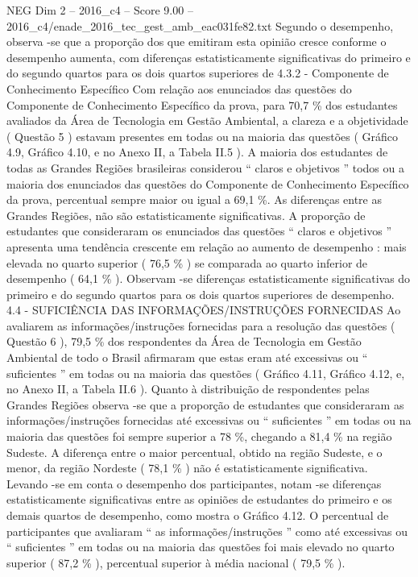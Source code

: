 \begin{textsample}{NEG Dim 2 – 2016\_c4 – Score 9.00 – 2016\_c4/enade\_2016\_tec\_gest\_amb\_eac031fe82.txt}
Segundo o desempenho, observa -se que a proporção dos que emitiram esta opinião cresce conforme o desempenho aumenta, com diferenças estatisticamente significativas do primeiro e do segundo quartos para os dois quartos superiores de 4.3.2 - Componente de Conhecimento Específico Com relação aos enunciados das questões do Componente de Conhecimento Específico da prova, para 70,7 \% dos estudantes avaliados da Área de Tecnologia em Gestão Ambiental, a clareza e a objetividade ( Questão 5 ) estavam presentes em todas ou na maioria das questões ( Gráfico 4.9, Gráfico 4.10, e no Anexo II, a Tabela II.5 ).
A maioria dos estudantes de todas as Grandes Regiões brasileiras considerou “ claros e objetivos ” todos ou a maioria dos enunciados das questões do Componente de Conhecimento Específico da prova, percentual sempre maior ou igual a 69,1 \%.
As diferenças entre as Grandes Regiões, não são estatisticamente significativas.
A proporção de estudantes que consideraram os enunciados das questões “ claros e objetivos ” apresenta uma tendência crescente em relação ao aumento de desempenho : mais elevada no quarto superior ( 76,5 \% ) se comparada ao quarto inferior de desempenho ( 64,1 \% ).
Observam -se diferenças estatisticamente significativas do primeiro e do segundo quartos para os dois quartos superiores de desempenho. 4.4 - SUFICIÊNCIA DAS INFORMAÇÕES/INSTRUÇÕES FORNECIDAS Ao avaliarem as informações/instruções fornecidas para a resolução das questões ( Questão 6 ), 79,5 \% dos respondentes da Área de Tecnologia em Gestão Ambiental de todo o Brasil afirmaram que estas eram até excessivas ou “ suficientes ” em todas ou na maioria das questões ( Gráfico 4.11, Gráfico 4.12, e, no Anexo II, a Tabela II.6 ).
Quanto à distribuição de respondentes pelas Grandes Regiões observa -se que a proporção de estudantes que consideraram as informações/instruções fornecidas até excessivas ou “ suficientes ” em todas ou na maioria das questões foi sempre superior a 78 \%, chegando a 81,4 \% na região Sudeste.
A diferença entre o maior percentual, obtido na região Sudeste, e o menor, da região Nordeste ( 78,1 \% ) não é estatisticamente significativa.
Levando -se em conta o desempenho dos participantes, notam -se diferenças estatisticamente significativas entre as opiniões de estudantes do primeiro e os demais quartos de desempenho, como mostra o Gráfico 4.12.
O percentual de participantes que avaliaram “ as informações/instruções ” como até excessivas ou “ suficientes ” em todas ou na maioria das questões foi mais elevado no quarto superior ( 87,2 \% ), percentual superior à média nacional ( 79,5 \% ).

\end{textsample}
